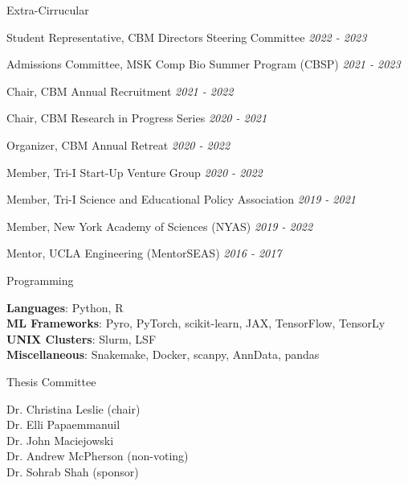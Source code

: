 \documentclass{resume} %
\begin{document}
\begin{rSection}{Extra-Cirrucular} \itemsep -3pt
\item Student Representative, CBM Directors Steering Committee \hfill {\em 2022 - 2023}
\item Admissions Committee, MSK Comp Bio Summer Program (CBSP) \hfill {\em 2021 - 2023}
\item Chair, CBM Annual Recruitment \hfill {\em 2021 - 2022}
\item Chair, CBM Research in Progress Series \hfill {\em 2020 - 2021}
\item Organizer, CBM Annual Retreat \hfill {\em 2020 - 2022}
\item Member, Tri-I Start-Up Venture Group \hfill {\em 2020 - 2022}
\item Member, Tri-I Science and Educational Policy Association \hfill {\em 2019 - 2021}
\item Member, New York Academy of Sciences (NYAS) \hfill {\em 2019 - 2022}
\item Mentor, UCLA Engineering (MentorSEAS) \hfill {\em 2016 - 2017}

\end{rSection}


\begin{rSection}{Programming}

\textbf{Languages}: Python, R \\
\textbf{ML Frameworks}: Pyro, PyTorch, scikit-learn, JAX, TensorFlow, TensorLy \\
\textbf{UNIX Clusters}: Slurm, LSF \\
\textbf{Miscellaneous}: Snakemake, Docker, scanpy, AnnData, pandas

\end{rSection}


\begin{rSection}{Thesis Committee}

Dr. Christina Leslie (chair) \\
Dr. Elli Papaemmanuil \\
Dr. John Maciejowski \\
Dr. Andrew McPherson (non-voting) \\
Dr. Sohrab Shah (sponsor)

\end{rSection}
\end{document}
